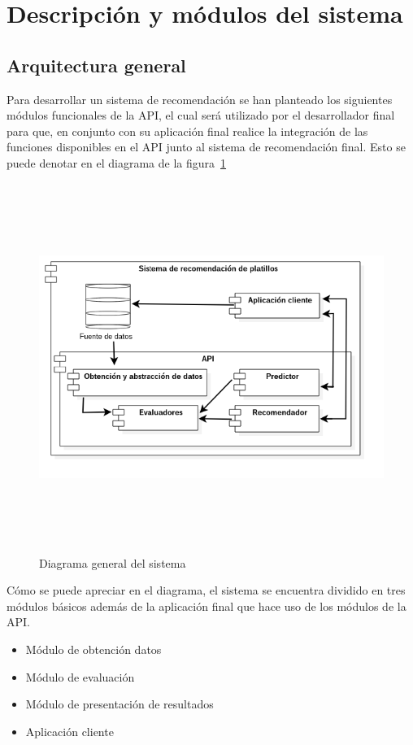 \section {Descripción y módulos del sistema}

  \subsection{Arquitectura general}
    Para desarrollar un sistema de recomendación se han planteado los siguientes módulos funcionales de la API, el cual será utilizado por el desarrollador final para que, en conjunto con su aplicación final realice la integración de las funciones disponibles en el API junto al sistema de recomendación final. Esto se puede denotar en el diagrama de la figura~\ref{fig:architecture}

\newpage
    \begin{landscape}
      \begin{figure}[h!]
      \centering
      \includegraphics[width=22.5cm,height=12cm]{./images/architecture.png}
      \caption{Diagrama general del sistema}
      \label{fig:architecture}
    \end{figure}
    \end{landscape}
  \newpage

Cómo se puede apreciar en el diagrama, el sistema se encuentra dividido en tres módulos básicos además de la aplicación final que hace uso de los módulos de la API.
    \begin{itemize}
    \item Módulo de obtención datos
    \item Módulo de evaluación
    \item Módulo de presentación de resultados
    \item Aplicación cliente
  \end{itemize}

